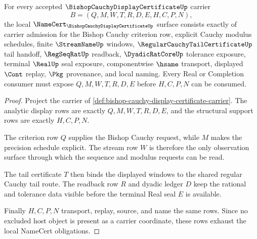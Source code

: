 \begin{theorem}
\label{thm:bishop-cauchy-display-certificate-namecert-obligations}
For every accepted $\BishopCauchyDisplayCertificateUp$ carrier
$$
B=(Q,M,W,T,R,D,E,H,C,P,N),
$$
the local $\NameCert_{\BishopCauchyDisplayCertificateUp}$ surface consists exactly of carrier admission for the Bishop Cauchy criterion row, explicit Cauchy modulus schedules, finite $\StreamNameUp$ windows, $\RegularCauchyTailCertificateUp$ tail handoff, $\RegSeqRatUp$ readback, $\DyadicRatCoreUp$ tolerance exposure, terminal $\RealUp$ seal exposure, componentwise $\hsame$ transport, displayed $\Cont$ replay, $\Pkg$ provenance, and local naming. Every Real or Completion consumer must expose $Q,M,W,T,R,D,E$ before $H,C,P,N$ can be consumed.
\end{theorem}
\begin{proof}
Project the carrier of \autoref{def:bishop-cauchy-display-certificate-carrier}. The analytic display rows are exactly $Q,M,W,T,R,D,E$, and the structural support rows are exactly $H,C,P,N$.

The criterion row $Q$ supplies the Bishop Cauchy request, while $M$ makes the precision schedule explicit. The stream row $W$ is therefore the only observation surface through which the sequence and modulus requests can be read.

The tail certificate $T$ then binds the displayed windows to the shared regular Cauchy tail route. The readback row $R$ and dyadic ledger $D$ keep the rational and tolerance data visible before the terminal Real seal $E$ is available.

Finally $H,C,P,N$ transport, replay, source, and name the same rows. Since no excluded host object is present as a carrier coordinate, these rows exhaust the local NameCert obligations.
\end{proof}

